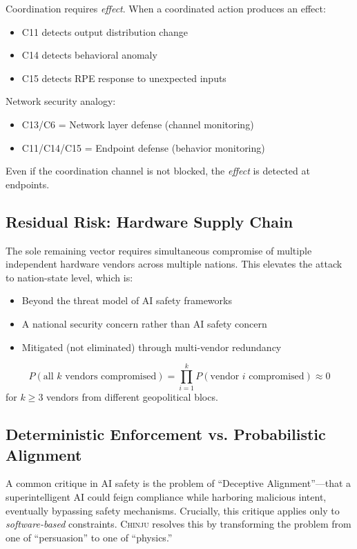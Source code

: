 \documentclass[11pt,a4paper]{article}
\newcommand{\chinju}{\textsc{Chinju}}
\begin{document}
Coordination requires \emph{effect}.
When a coordinated action produces an effect:
\begin{itemize}
    \item C11 detects output distribution change
    \item C14 detects behavioral anomaly
    \item C15 detects RPE response to unexpected inputs
\end{itemize}

Network security analogy:
\begin{itemize}
    \item C13/C6 = Network layer defense (channel monitoring)
    \item C11/C14/C15 = Endpoint defense (behavior monitoring)
\end{itemize}

Even if the coordination channel is not blocked, the \emph{effect} is detected at endpoints.

\subsection{Residual Risk: Hardware Supply Chain}

The sole remaining vector requires simultaneous compromise of multiple independent hardware vendors across multiple nations.
This elevates the attack to nation-state level, which is:
\begin{itemize}
    \item Beyond the threat model of AI safety frameworks
    \item A national security concern rather than AI safety concern
    \item Mitigated (not eliminated) through multi-vendor redundancy
\end{itemize}

\begin{equation}
P(\text{all } k \text{ vendors compromised}) = \prod_{i=1}^{k} P(\text{vendor } i \text{ compromised}) \approx 0
\end{equation}
for $k \geq 3$ vendors from different geopolitical blocs.

\subsection{Deterministic Enforcement vs. Probabilistic Alignment}
\label{sec:deterministic_enforcement}

A common critique in AI safety is the problem of ``Deceptive Alignment''---that a superintelligent AI could feign compliance while harboring malicious intent, eventually bypassing safety mechanisms.
Crucially, this critique applies only to \emph{software-based} constraints.
\chinju{} resolves this by transforming the problem from one of ``persuasion'' to one of ``physics.''
\end{document}
